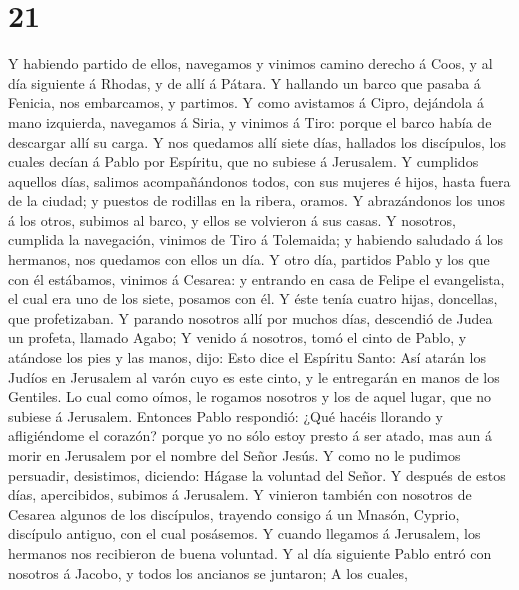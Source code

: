 \hypertarget{section-20}{%
\section{21}\label{section-20}}

 Y habiendo partido de ellos, navegamos y vinimos camino
derecho á Coos, y al día siguiente á Rhodas, y de allí á Pátara.
 Y hallando un barco que pasaba á Fenicia, nos embarcamos, y
partimos.  Y como avistamos á Cipro, dejándola á mano
izquierda, navegamos á Siria, y vinimos á Tiro: porque el barco había de
descargar allí su carga.  Y nos quedamos allí siete días,
hallados los discípulos, los cuales decían á Pablo por Espíritu, que no
subiese á Jerusalem.  Y cumplidos aquellos días, salimos
acompañándonos todos, con sus mujeres é hijos, hasta fuera de la ciudad;
y puestos de rodillas en la ribera, oramos.  Y abrazándonos
los unos á los otros, subimos al barco, y ellos se volvieron á sus
casas.  Y nosotros, cumplida la navegación, vinimos de Tiro
á Tolemaida; y habiendo saludado á los hermanos, nos quedamos con ellos
un día.  Y otro día, partidos Pablo y los que con él
estábamos, vinimos á Cesarea: y entrando en casa de Felipe el
evangelista, el cual era uno de los siete, posamos con él. 
Y éste tenía cuatro hijas, doncellas, que profetizaban.  Y
parando nosotros allí por muchos días, descendió de Judea un profeta,
llamado Agabo;  Y venido á nosotros, tomó el cinto de
Pablo, y atándose los pies y las manos, dijo: Esto dice el Espíritu
Santo: Así atarán los Judíos en Jerusalem al varón cuyo es este cinto, y
le entregarán en manos de los Gentiles.  Lo cual como
oímos, le rogamos nosotros y los de aquel lugar, que no subiese á
Jerusalem.  Entonces Pablo respondió: ¿Qué hacéis llorando
y afligiéndome el corazón? porque yo no sólo estoy presto á ser atado,
mas aun á morir en Jerusalem por el nombre del Señor Jesús.
 Y como no le pudimos persuadir, desistimos, diciendo:
Hágase la voluntad del Señor.  Y después de estos días,
apercibidos, subimos á Jerusalem.  Y vinieron también con
nosotros de Cesarea algunos de los discípulos, trayendo consigo á un
Mnasón, Cyprio, discípulo antiguo, con el cual posásemos. 
Y cuando llegamos á Jerusalem, los hermanos nos recibieron de buena
voluntad.  Y al día siguiente Pablo entró con nosotros á
Jacobo, y todos los ancianos se juntaron;  A los cuales,
